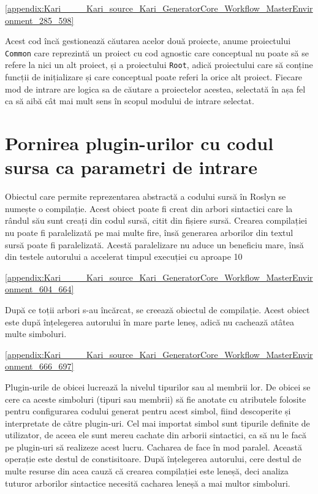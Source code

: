 \documentclass[a4paper,12pt]{report}
\begin{document}
\ref{appendix:Kari____Kari_source_Kari_GeneratorCore_Workflow_MasterEnvironment_285_598}

Acest cod încă gestionează căutarea acelor două proiecte, anume proiectului \texttt{Common} care reprezintă un proiect cu cod agnostic care conceptual nu poate să se refere la nici un alt proiect, și a proiectului \texttt{Root}, adică proiectului care să conține funcții de inițializare și care conceptual poate referi la orice alt proiect.
Fiecare mod de intrare are logica sa de căutare a proiectelor acestea, selectată în așa fel ca să aibă cât mai mult sens în scopul modului de intrare selectat.

\section{Pornirea plugin-urilor cu codul sursa ca parametri de intrare}

Obiectul care permite reprezentarea abstractă a codului sursă în Roslyn se numește o compilație.
Acest obiect poate fi creat din arbori sintactici care la rândul său sunt creați din codul sursă, citit din fișiere sursă.
Crearea compilației nu poate fi paralelizată pe mai multe fire, însă generarea arborilor din textul sursă poate fi paralelizată.
Acestă paralelizare nu aduce un beneficiu mare, însă din testele autorului a accelerat timpul execuției cu aproape 10%

\ref{appendix:Kari____Kari_source_Kari_GeneratorCore_Workflow_MasterEnvironment_604_664}

După ce toții arbori s-au încărcat, se creează obiectul de compilație.
Acest obiect este după înțelegerea autorului în mare parte leneș, adică nu cachează atâtea multe simboluri.

\ref{appendix:Kari____Kari_source_Kari_GeneratorCore_Workflow_MasterEnvironment_666_697}

Plugin-urile de obicei lucrează la nivelul tipurilor sau al membrii lor.
De obicei se cere ca aceste simboluri (tipuri sau membrii) să fie anotate cu atributele folosite pentru configurarea codului generat pentru acest simbol, fiind descoperite și interpretate de către plugin-uri.
Cel mai importat simbol sunt tipurile definite de utilizator, de aceea ele sunt mereu cachate din arborii sintactici, ca să nu le facă pe plugin-uri să realizeze acest lucru.
Cacharea de face în mod paralel.
Această operație este destul de constisitoare.
După înțelegerea autorului, cere destul de multe resurse din acea cauză că crearea compilației este leneșă, deci analiza tuturor arborilor sintactice necesită cacharea leneșă a mai multor simboluri.
\end{document}
